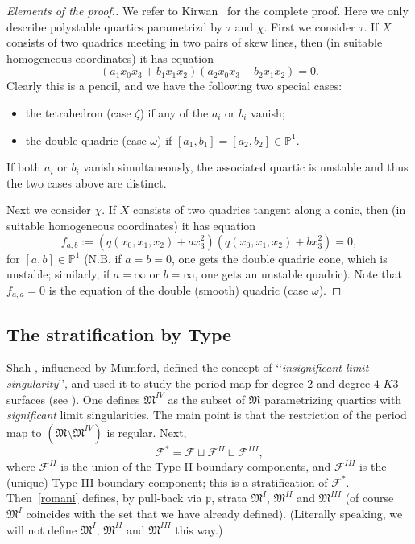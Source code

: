 \documentclass[11pt]{amsart}
\numberwithin{equation}{section}
\theoremstyle{plain}
\theoremstyle{remark}
\theoremstyle{definition}
\newcommand{\bP}{\mathbb{P}}
\newcommand{\cF}{\mathscr{F}}
\newcommand{\gp}{\mathfrak{p}}
\newcommand{\gM}{\mathfrak{M}}
\newcommand{\PP}{{\mathbb P}}
\begin{document}
\begin{proof}[Elements of the proof.]
%
We refer to Kirwan~\cite[\S6]{kirwanhyp} for the complete proof. Here we only describe polystable quartics parametrizd by $\tau$ and $\chi$. 
First we consider $\tau$. If $X$ consists  of two quadrics meeting in two pairs of skew lines, then (in suitable homogeneous coordinates)   
it has equation 
% 
$$(a_1 x_0x_3+b_1 x_1x_2)(a_2 x_0x_3+b_2 x_1x_2)=0.$$
%
Clearly this is a pencil, and we have the following two special cases:
%
\begin{itemize}
\item  the tetrahedron (case $\zeta$) if any of the $a_i$ or $b_i$ vanish;
\item the double quadric (case $\omega$) if $[a_1,b_1]=[a_2,b_2]\in\PP^1$.
\end{itemize}
%
If both $a_i$ or $b_i$ vanish simultaneously, the associated quartic is unstable and thus the two cases above are distinct. 

Next we consider $\chi$. If $X$ consists  of two quadrics  tangent along a conic,  then (in suitable homogeneous coordinates)   
it has equation 
$$f_{a,b}:=(q(x_0,x_1,x_2)+a x_3^2)(q(x_0,x_1,x_2)+b x_3^2)=0,$$
%
for $[a,b]\in \bP^1$ (N.B. if $a=b=0$, one gets the double quadric cone, which is unstable; similarly, if $a=\infty$ or $b=\infty$, one gets an unstable quadric). Note that $f_{a,a}=0$  is the equation of the double (smooth) quadric (case $\omega$). 
% 
\end{proof}
%



%
\subsection{The stratification  by Type}\label{subsec:hodgestrata}
Shah \cite{shahinsignificant},  influenced by Mumford, defined the  concept  of \lq\lq {\it insignificant limit singularity}\rq\rq, and  used it to study the period map for degree $2$ and degree $4$ $K3$ surfaces (see \cite{shah,shah4}). 
 One defines $\gM^{IV}$ as  the subset of $\gM$ parametrizing quartics with  \emph{significant} limit singularities.  
 The main point is that the restriction of the period map to $(\gM\setminus\gM^{IV})$  is regular. Next,  
 \begin{equation}\label{romani}
%
 \cF^{*}=\cF\sqcup\cF^{II}\sqcup\cF^{III},
%
\end{equation}
%
   where $\cF^{II}$ is the union of the Type II boundary components, and  $\cF^{III}$ is the (unique) Type III boundary component; this is a  stratification of $\cF^{*}$. Then~\eqref{romani} 
   defines, by pull-back via $\gp$, strata $\gM^I$, $\gM^{II}$ and $\gM^{III}$ (of course  $\gM^I$ coincides with the set that we have already defined).  (Literally speaking, we will not define 
   $\gM^I$, $\gM^{II}$ and $\gM^{III}$ this way.)
\end{document}
